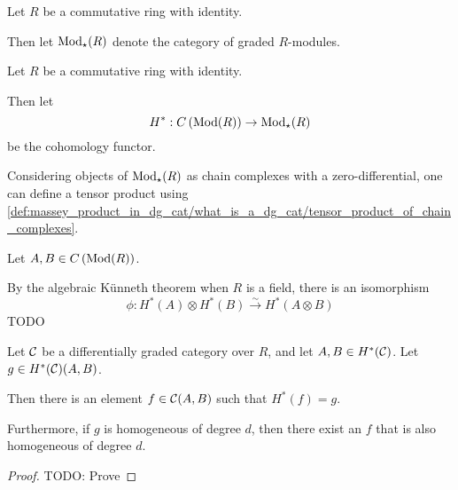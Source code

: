 \begin{notation}
    Let \( R \) be a commutative ring with identity.

    Then let \( \operatorname{Mod}_{\star}(R) \) denote the category of graded \( R \)-modules.
\end{notation}

\begin{notation}
    Let \( R \) be a commutative ring with identity.

    Then let
    \[
        H^*: C \left( \operatorname{Mod}(R) \right) \to \operatorname{Mod}_{\star}(R)
    \]
    be the cohomology functor.
\end{notation}

\begin{fact}
    \label{fact:massey_product_in_dg_cat/massey_product_definition/algebraic_kunneth_isomorphism}
    Considering objects of \( \operatorname{Mod}_{\star}(R) \) as chain complexes with a zero-differential, one can define a tensor product using \autoref{def:massey_product_in_dg_cat/what_is_a_dg_cat/tensor_product_of_chain_complexes}.

    Let \( A, B \in C \left( \operatorname{Mod}(R) \right) \).

    By the algebraic Künneth theorem when \( R \) is a field, there is an isomorphism
    \[
        \phi: H^*(A) \otimes H^*(B) \stackrel{\sim}{\to} H^*(A \otimes B)
    \]
    TODO
\end{fact}

\begin{lemma}
    \label{lem:massey_product_in_dg_cat/massey_product_definition/exist_lifting_h_star}
    Let \( {\mathcal{C}} \) be a differentially graded category over \( R \), and let \( A, B \in H^*({\mathcal{C}}) \). Let \( g \in H^*({\mathcal{C}})(A, B) \).

    Then there is an element \( f \in {\mathcal{C}}(A, B) \) such that \( H^*(f) = g \).

    Furthermore, if \( g \) is homogeneous of degree \( d \), then there exist an \( f \) that is also homogeneous of degree \( d \).
\end{lemma}
\begin{proof}
    TODO: Prove
\end{proof}

